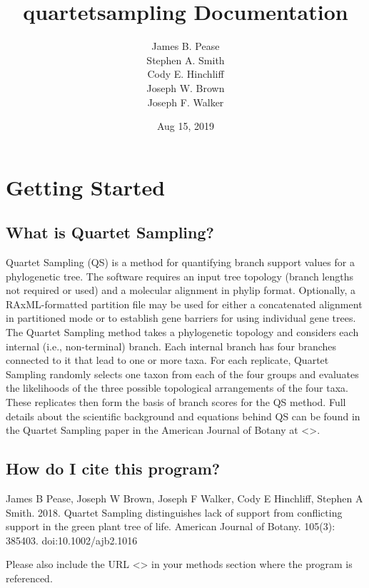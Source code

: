 \documentclass[letterpaper,12pt,english]{sphinxmanual}
\title{quartetsampling Documentation}
\date{Aug 15, 2019}
\author{James B. Pease \\ Stephen A. Smith \\ Cody E. Hinchliff \\Joseph W. Brown \\ Joseph F. Walker}
\begin{document}
\pagestyle{empty}
\sphinxmaketitle
\pagestyle{plain}
\sphinxtableofcontents
\pagestyle{normal}
\label{\detokenize{index::doc}}



\chapter{Getting Started}
\label{\detokenize{intro:getting-started}}\label{\detokenize{intro:intro}}\label{\detokenize{intro::doc}}

\section{What is Quartet Sampling?}
\label{\detokenize{intro:what-is-quartet-sampling}}
Quartet Sampling (QS) is a method for quantifying branch support values for a phylogenetic tree.  The software requires an input tree topology (branch lengths not required or used) and a molecular alignment in phylip format.  Optionally, a RAxML-formatted partition file may be used for either a concatenated alignment in partitioned mode or to establish gene barriers for using individual gene trees.  The Quartet Sampling method takes a phylogenetic topology and considers each internal (i.e., non-terminal) branch.  Each internal branch has four branches connected to it that lead to one or more taxa.  For each replicate, Quartet Sampling randomly selects one taxon from each of the four groups and evaluates the likelihoods of the three possible topological arrangements of the four taxa.  These replicates then form the basis of branch scores for the QS method.  Full details about the scientific background and equations behind QS can be found in the Quartet Sampling paper in the American Journal of Botany at \textless{}\textgreater{}.


\section{How do I cite this program?}
\label{\detokenize{intro:how-do-i-cite-this-program}}
James B Pease, Joseph W Brown, Joseph F Walker, Cody E Hinchliff, Stephen A Smith. 2018. Quartet Sampling distinguishes lack of support from conflicting support in the green plant tree of life. American Journal of Botany. 105(3): 385\textendash{}403. doi:10.1002/ajb2.1016

Please also include the URL \textless{}\textgreater{} in your methods section where the program is referenced.
\end{document}

